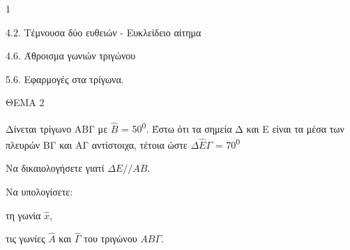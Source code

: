 \begin{ylh}{1}
    \item 4.2. Τέμνουσα δύο ευθειών - Ευκλείδειο αίτημα
    \item 4.6. Άθροισμα γωνιών τριγώνου
    \item 5.6. Εφαρμογές στα τρίγωνα.
\end{ylh}

ΘΕΜΑ 2

Δίνεται τρίγωνο ΑΒΓ με $\widehat{Β}$ = 50\textsuperscript{0}. Έστω ότι τα σημεία Δ και Ε είναι τα μέσα των πλευρών ΒΓ και ΑΓ αντίστοιχα, τέτοια ώστε $\Delta\widehat{Ε}\Gamma$ = 70\textsuperscript{0}
\begin{alist}
\item Να δικαιολογήσετε γιατί $\Delta E // AB$. 

\item Να υπολογίσετε:
\begin{rlist}
\item τη γωνία $\widehat{x}$, 
\item τις γωνίες $\widehat{A}$ και $\widehat{\Gamma}$ του τριγώνου $AB\Gamma$. 
\end{rlist}

\begin{center}
\end{center}
\end{alist}
